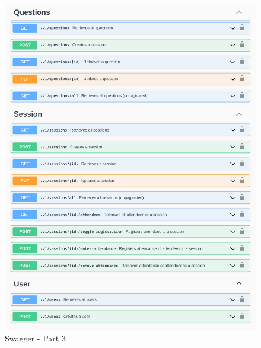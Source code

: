 \begin{justify}
        \begin{figure}[H]
            \begin{minipage}[trim]{1\textwidth}
            \centerline{\includegraphics[width=150mm,scale=1]{figures/implementation_and_testing/implementation/backend/swagger-3.pdf}}
            \caption{Swagger - Part 3}
            \end{minipage}
        \end{figure}



\end{justify}
